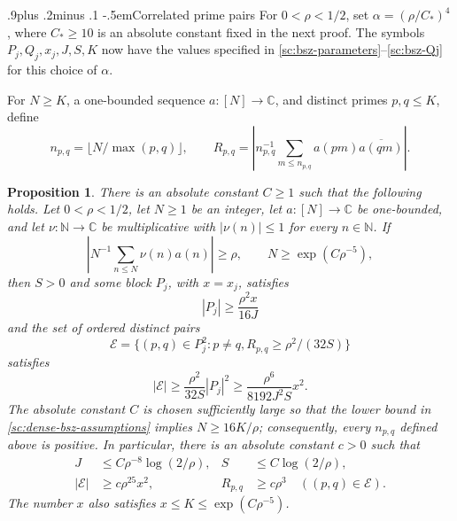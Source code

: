 \documentclass[twoside]{aomart}
\makeatletter
\theoremstyle{paperplain}
\newtheorem{proposition}[theorem]{Proposition}
\theoremstyle{paperdefinition}
\renewcommand\subsection{\@startsection{subsection}{2}{\z@}
  {.9\baselineskip plus .2\baselineskip minus .1\baselineskip}
  {-.5em}{\normalfont\bfseries}}
\numberwithin{equation}{section}
\makeatother
\begin{document}
\subsection{Correlated prime pairs}
For $0<\rho<1/2$, set $\alpha=(\rho/C_*)^4$, where $C_*\ge10$
is an absolute constant fixed in the next proof. The symbols
$P_j,Q_j,x_j,J,S,K$ now have the values specified in
\eqref{sc:bsz-parameters}--\eqref{sc:bsz-Qj} for this choice of $\alpha$.

For $N\ge K$, a one-bounded sequence $a:[N]\to\mathbb C$,
and distinct primes $p,q\le K$, define
\begin{equation*}
 n_{p,q}=\lfloor N/\max(p,q)\rfloor,\qquad
 R_{p,q}=\left|n_{p,q}^{-1}\sum_{m\le n_{p,q}}
                 a(pm)\overline{a(qm)}\right|.
\end{equation*}
\begin{proposition}\label{prop:bsz_dense}
There is an absolute constant $C\ge1$ such that the following holds.
Let $0<\rho<1/2$, let $N\ge1$ be an integer,
let $a:[N]\to\mathbb C$ be one-bounded, and let
$\nu:\mathbb N\to\mathbb C$ be multiplicative with
$|\nu(n)|\le1$ for every $n\in\mathbb N$. If
\begin{equation}
 \left|N^{-1}\sum_{n\le N}\nu(n)a(n)\right|\ge\rho,
 \qquad N\ge\exp(C\rho^{-5}),
 \label{sc:dense-bsz-assumptions}
\end{equation}
then $S>0$ and some block $P_j$, with $x=x_j$, satisfies
\begin{equation}
 |P_j|\ge\frac{\rho^2x}{16J}
 \label{sc:dense-bsz-block-size}
\end{equation}
and the set of ordered distinct pairs
\begin{equation*}
 \mathcal E=\{(p,q)\in P_j^2:p\ne q,
                   R_{p,q}\ge\rho^2/(32S)\}
\end{equation*}
satisfies
\begin{equation}
 |\mathcal E|\ge\frac{\rho^2}{32S}|P_j|^2
 \ge\frac{\rho^6}{8192J^2S}x^2.
 \label{sc:dense-bsz-edge-count}
\end{equation}
The absolute constant $C$ is chosen sufficiently large so that the
lower bound in \eqref{sc:dense-bsz-assumptions} implies $N\ge16K/\rho$; consequently,
every $n_{p,q}$ defined above is positive.
In particular, there is an absolute constant $c>0$ such that
\begin{equation}
 \begin{aligned}
 J&\le C\rho^{-8}\log(2/\rho),&
 S&\le C\log(2/\rho),\\
 |\mathcal E|&\ge c\rho^{25}x^2,&
 R_{p,q}&\ge c\rho^3\quad((p,q)\in\mathcal E).
 \end{aligned}
 \label{sc:dense-bsz-polynomial}
\end{equation}
The number $x$ also satisfies $x\le K\le\exp(C\rho^{-5})$.
\end{proposition}
\end{document}
